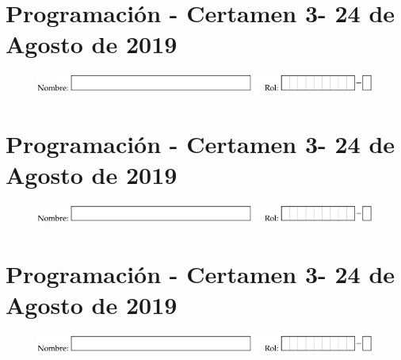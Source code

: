 \documentclass[spanish]{scrartcl}
\newcommand{\numCert}{3}
\newcommand{\annoCert}{2019}
\newcommand{\fechaCert}{24 de Agosto de \annoCert}
\begin{document}
\section*{Programación - Certamen \numCert - \fechaCert}
\vspace*{-.6cm}
\begin{figure}[h]
    \centering
    \includegraphics[scale=0.9]{Imagenes/nombrerol.png}
\end{figure}
\vspace*{-1.0cm}

\pagebreak[4]

\section*{Programación - Certamen \numCert - \fechaCert}
\vspace*{-.6cm}
\begin{figure}[h]
    \centering
    \includegraphics[scale=0.9]{Imagenes/nombrerol.png}
\end{figure}
\vspace*{-1.0cm}

\pagebreak[4]

\section*{Programación - Certamen \numCert - \fechaCert}
\vspace*{-.6cm}
\begin{figure}[h]
    \centering
    \includegraphics[scale=0.9]{Imagenes/nombrerol.png}
\end{figure}
\vspace*{-1.0cm}

\end{document}
